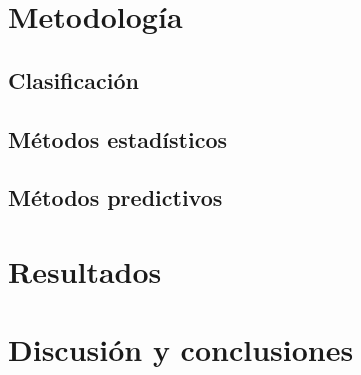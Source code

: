 \documentclass[colorinlistoftodos]{article}
\begin{document}
\section{Metodología}
\subsection{Clasificación}
\subsection{Métodos estadísticos}
\subsection{Métodos predictivos}




\section{Resultados}

\section{Discusión y conclusiones}




\listoftodos%
\end{document}
